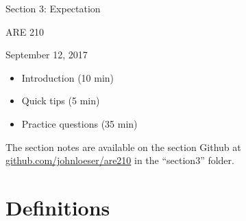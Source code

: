 \documentclass[12pt,english]{article}
\begin{document}
\begin{center}
{\Large{}Section 3: Expectation}
\par\end{center}{\Large \par}

\begin{center}
ARE 210
\par\end{center}

\begin{center}
September 12, 2017
\par\end{center}

\begin{itemize}
	\item Introduction (10 min)
	\item Quick tips (5 min)
	\item Practice questions (35 min)
\end{itemize}
The section notes are available on the section Github at \href{github.com/johnloeser/eep152}{github.com/johnloeser/are210} in the ``section3'' folder.

\section{Definitions}
\end{document}
